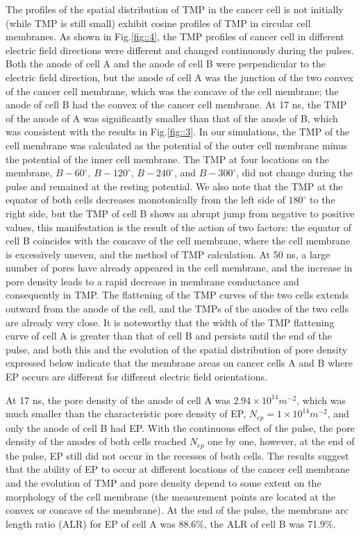 \documentclass[conference]{IEEEtran}
\begin{document}
The profiles of the spatial distribution of TMP in the cancer cell is not initially (while TMP is still small) exhibit cosine profiles of TMP in circular cell membranes. As shown in Fig.\ref{fig::4}, the TMP profiles of cancer cell in different electric field directions were different and changed continuously during the pulses. Both the anode of cell A and the anode of cell B were perpendicular to the electric field direction, but the anode of cell A was the junction of the two convex of the cancer cell membrane, which was the concave of the cell membrane; the anode of cell B had the convex of the cancer cell membrane. At 17 ns, the TMP of the anode of A was significantly smaller than that of the anode of B, which was consistent with the results in Fig.\ref{fig::3}. In our simulations, the TMP of the cell membrane was calculated as the potential of the outer cell membrane minus the potential of the inner cell membrane. The TMP at four locations on the membrane, $B-60^{\circ}$, $B-120^{\circ}$, $B-240^{\circ}$, and $B-300^{\circ}$, did not change during the pulse and remained at the resting potential. We also note that the TMP at the equator of both cells decreases monotonically from the left side of $180^\circ$ to the right side, but the TMP of cell B shows an abrupt jump from negative to positive values, this manifestation is the result of the action of two factors: the equator of cell B coincides with the concave of the cell membrane, where the cell membrane is excessively uneven, and the method of TMP calculation. At 50 ns, a large number of pores have already appeared in the cell membrane, and the increase in pore density leads to a rapid decrease in membrane conductance and consequently in TMP. The flattening of the TMP curves of the two cells extends outward from the anode of the cell, and the TMPs of the anodes of the two cells are already very close. It is noteworthy that the width of the TMP flattening curve of cell A is greater than that of cell B and persists until the end of the pulse, and both this and the evolution of the spatial distribution of pore density expressed below indicate that the membrane areas on cancer cells A and B where EP occurs are different for different electric field orientations.

At 17 ns, the pore density of the anode of cell A was $2.94\times10^{14}m^{-2}$, which was much smaller than the characteristic pore density of EP, $N_{ep} = 1\times10^{14}m^{-2}$, and only the anode of cell B had EP. With the continuous effect of the pulse, the pore density of the anodes of both cells reached $N_{ep}$ one by one, however, at the end of the pulse, EP still did not occur in the recesses of both cells. The results suggest that the ability of EP to occur at different locations of the cancer cell membrane and the evolution of TMP and pore density depend to some extent on the morphology of the cell membrane (the measurement points are located at the convex or concave of the membrane). At the end of the pulse, the membrane arc length ratio (ALR) for EP of cell A was 88.6$\%$, the ALR of cell B was 71.9$\%$. 
\end{document}
